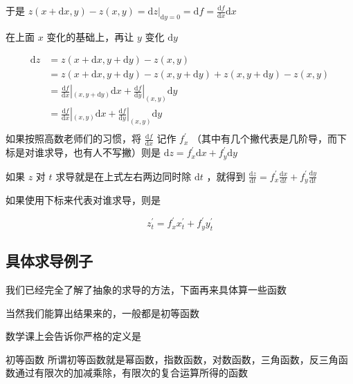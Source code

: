 \documentclass[lang=cn,newtx,10pt,scheme=chinese]{elegantbook}
\begin{document}
\begin{itemize}
        于是 $z(x+\mathrm{d}x,y)-z(x,y)=\mathrm{d}z|_{\mathrm{d}y=0}=\mathrm{d}f=\frac{\mathrm{d}f}{\mathrm{d}x}\mathrm{d}x$

        

        在上面 $x$ 变化的基础上，再让 $y$ 变化 $\mathrm{d}y$ 
        
        \begin{equation}
          \begin{aligned}
          \mathrm{d}z&=z(x+\mathrm{d}x,y+\mathrm{d}y)-z(x,y)\\
          &=z(x+\mathrm{d}x,y+\mathrm{d}y)-z(x,y+\mathrm{d}y)+z(x,y+\mathrm{d}y)-z(x,y) \\
          &=\frac{\mathrm{d}f}{\mathrm{d}x}|_{(x,y+\mathrm{d}y)} \mathrm{d}x+\frac{\mathrm{d}f}{\mathrm{d}y}|_{(x,y)} \mathrm{d}y\\
          &=\frac{\mathrm{d}f}{\mathrm{d}x}|_{(x,y)} \mathrm{d}x+\frac{\mathrm{d}f}{\mathrm{d}y}|_{(x,y)} \mathrm{d}y\\
          \end{aligned}
        \end{equation}
如果按照高数老师们的习惯，将 $\frac{\mathrm{d}f}{\mathrm{d}x}$ 记作 $f^{\prime }_{x} $ （其中有几个撇代表是几阶导，而下标是对谁求导，也有人不写撇）则是
        $\mathrm{d}z=f^{\prime }_{x}\mathrm{d}x+f^{\prime }_{y}\mathrm{d}y$

如果 $z$ 对 $t$ 求导就是在上式左右两边同时除 $\mathrm{d}t$ ，就得到 $\frac{\mathrm{d}z}{\mathrm{d}t}=f^{\prime }_{x}\frac{\mathrm{d}x}{\mathrm{d}t}+f^{\prime }_{y}\frac{\mathrm{d}y}{\mathrm{d}t}$

如果使用下标来代表对谁求导，则是

\begin{equation}
  z^{\prime }_{t}=f^{\prime }_{x}x^{\prime }_{t}+f^{\prime }_{y}y^{\prime }_{t}
\end{equation}
\end{itemize}

\subsection{具体求导例子}

我们已经完全了解了抽象的求导的方法，下面再来具体算一些函数

当然我们能算出结果来的，一般都是初等函数

数学课上会告诉你严格的定义是

\begin{definition}{初等函数}
  所谓初等函数就是幂函数，指数函数，对数函数，三角函数，反三角函数通过有限次的加减乘除，有限次的复合运算所得的函数
\end{definition}
\end{document}
